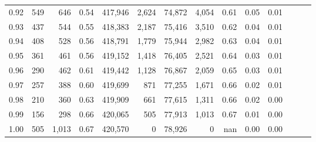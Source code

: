 \begin{tabular}{rrrrrrrrrrrrrr}
0.92 &    549 &    646 &  0.54 &  417,946 &    2,624 &  74,872 &   4,054 &  0.61 &  0.05 &      0.01 \\
0.93 &    437 &    544 &  0.55 &  418,383 &    2,187 &  75,416 &   3,510 &  0.62 &  0.04 &      0.01 \\
0.94 &    408 &    528 &  0.56 &  418,791 &    1,779 &  75,944 &   2,982 &  0.63 &  0.04 &      0.01 \\
0.95 &    361 &    461 &  0.56 &  419,152 &    1,418 &  76,405 &   2,521 &  0.64 &  0.03 &      0.01 \\
0.96 &    290 &    462 &  0.61 &  419,442 &    1,128 &  76,867 &   2,059 &  0.65 &  0.03 &      0.01 \\
0.97 &    257 &    388 &  0.60 &  419,699 &      871 &  77,255 &   1,671 &  0.66 &  0.02 &      0.01 \\
0.98 &    210 &    360 &  0.63 &  419,909 &      661 &  77,615 &   1,311 &  0.66 &  0.02 &      0.00 \\
0.99 &    156 &    298 &  0.66 &  420,065 &      505 &  77,913 &   1,013 &  0.67 &  0.01 &      0.00 \\
1.00 &    505 &  1,013 &  0.67 &  420,570 &        0 &  78,926 &       0 &   nan &  0.00 &      0.00 \\
\bottomrule
\end{tabular}
